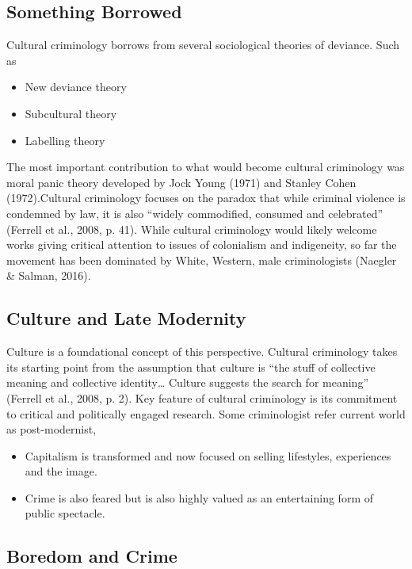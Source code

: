 \documentclass{article}
\begin{document}
\subsection{Something Borrowed}

Cultural criminology borrows from several sociological theories of deviance. Such as 

\begin{itemize}
    \item New deviance theory
    \item Subcultural theory
    \item Labelling theory
\end{itemize}

The most important contribution to what would become cultural criminology was moral panic theory developed by Jock Young (1971) and Stanley Cohen (1972).Cultural criminology focuses on the paradox that while criminal violence is condemned by law, it is also “widely commodified, consumed and celebrated” (Ferrell et al., 2008, p. 41). While cultural criminology would likely welcome works giving critical attention to issues of colonialism and indigeneity, so far the movement has been dominated by White, Western, male criminologists (Naegler \& Salman, 2016).

\subsection{Culture and Late Modernity}

Culture is a foundational concept of this perspective. Cultural criminology takes its starting point from the assumption that culture is “the stuff of collective meaning and collective identity… Culture suggests the search for meaning” (Ferrell et al., 2008, p. 2). Key feature of cultural criminology is its commitment to critical and politically engaged research. Some criminologist refer current world as post-modernist, 

\begin{itemize}
    \item Capitalism is transformed and now focused on selling lifestyles, experiences and the image.
    \item Crime is also feared but is also highly valued as an entertaining form of public spectacle.
\end{itemize}

\subsection{Boredom and Crime}
\end{document}
